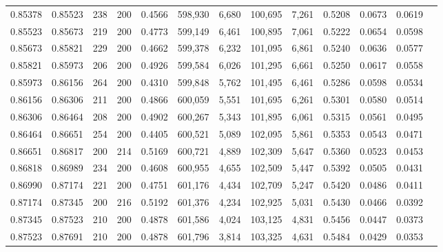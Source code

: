 \begin{tabular}{rrrrrrrrrrrrr}
0.85378 & 0.85523 &   238 & 200 &                                     0.4566 & 598,930 &   6,680 & 100,695 &   7,261 & 0.5208 & 0.0673 & 0.0619 \\
0.85523 & 0.85673 &   219 & 200 &                                     0.4773 & 599,149 &   6,461 & 100,895 &   7,061 & 0.5222 & 0.0654 & 0.0598 \\
0.85673 & 0.85821 &   229 & 200 &                                     0.4662 & 599,378 &   6,232 & 101,095 &   6,861 & 0.5240 & 0.0636 & 0.0577 \\
0.85821 & 0.85973 &   206 & 200 &                                     0.4926 & 599,584 &   6,026 & 101,295 &   6,661 & 0.5250 & 0.0617 & 0.0558 \\
0.85973 & 0.86156 &   264 & 200 &                                     0.4310 & 599,848 &   5,762 & 101,495 &   6,461 & 0.5286 & 0.0598 & 0.0534 \\
0.86156 & 0.86306 &   211 & 200 &                                     0.4866 & 600,059 &   5,551 & 101,695 &   6,261 & 0.5301 & 0.0580 & 0.0514 \\
0.86306 & 0.86464 &   208 & 200 &                                     0.4902 & 600,267 &   5,343 & 101,895 &   6,061 & 0.5315 & 0.0561 & 0.0495 \\
0.86464 & 0.86651 &   254 & 200 &                                     0.4405 & 600,521 &   5,089 & 102,095 &   5,861 & 0.5353 & 0.0543 & 0.0471 \\
0.86651 & 0.86817 &   200 & 214 &                                     0.5169 & 600,721 &   4,889 & 102,309 &   5,647 & 0.5360 & 0.0523 & 0.0453 \\
0.86818 & 0.86989 &   234 & 200 &                                     0.4608 & 600,955 &   4,655 & 102,509 &   5,447 & 0.5392 & 0.0505 & 0.0431 \\
0.86990 & 0.87174 &   221 & 200 &                                     0.4751 & 601,176 &   4,434 & 102,709 &   5,247 & 0.5420 & 0.0486 & 0.0411 \\
0.87174 & 0.87345 &   200 & 216 &                                     0.5192 & 601,376 &   4,234 & 102,925 &   5,031 & 0.5430 & 0.0466 & 0.0392 \\
0.87345 & 0.87523 &   210 & 200 &                                     0.4878 & 601,586 &   4,024 & 103,125 &   4,831 & 0.5456 & 0.0447 & 0.0373 \\
0.87523 & 0.87691 &   210 & 200 &                                     0.4878 & 601,796 &   3,814 & 103,325 &   4,631 & 0.5484 & 0.0429 & 0.0353 \\

\end{tabular}
